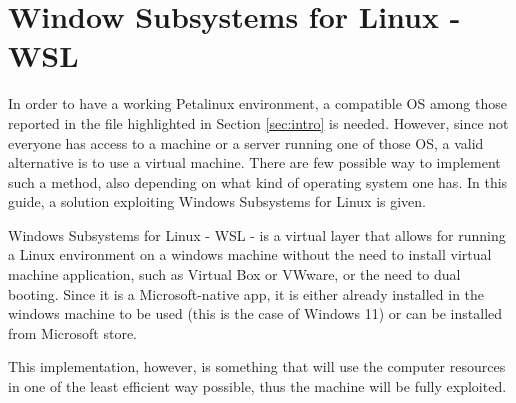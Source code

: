 \chapter{Window Subsystems for Linux - WSL}
In order to have a working Petalinux environment, a compatible OS among those reported in the file highlighted in Section \ref{sec:intro} is needed. However, since not everyone has access to a machine or a server running one of those OS, a valid alternative is to use a virtual machine. There are few possible way to implement such a method, also depending on what kind of operating system one has. In this guide, a solution exploiting Windows Subsystems for Linux is given.

Windows Subsystems for Linux - WSL - is a virtual layer that allows for running a Linux environment on a windows machine without the need to install virtual machine application, such as Virtual Box or VWware, or the need to dual booting. Since it is a Microsoft-native app, it is either already installed in the windows machine to be used (this is the case of Windows 11) or can be installed from Microsoft store.

This implementation, however, is something that will use the computer resources in one of the least efficient way possible, thus the machine will be fully exploited.

